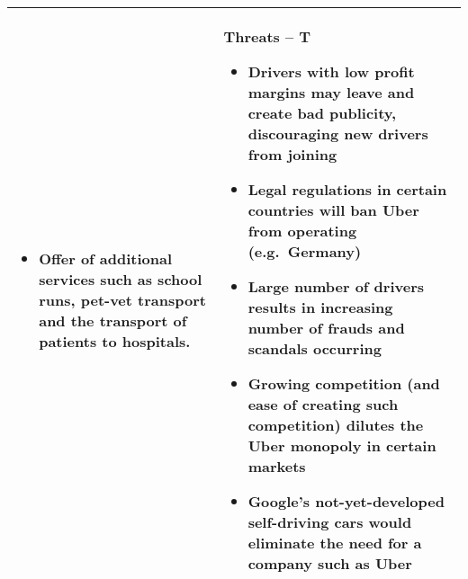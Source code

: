 \begin{tabular}{|p{7cm}|p{7cm}|}
\begin{itemize}[leftmargin=0.8em]
    \item Offer of additional services such as school runs, pet-vet transport and the transport of patients to hospitals.
  \end{itemize}
  &
  \textbf{Threats -- T}
  \begin{itemize}[leftmargin=0.8em]
    \item Drivers with low profit margins may leave and create bad publicity, discouraging new drivers from joining
    \item Legal regulations in certain countries will ban Uber from operating (e.g.\ Germany)
    \item Large number of drivers results in increasing number of frauds and scandals occurring
    \item Growing competition (and ease of creating such competition) dilutes the Uber monopoly in certain markets
    \item Google's not-yet-developed self-driving cars would eliminate the need for a company such as Uber
  \end{itemize}
  \\
  \hline
\end{tabular}
